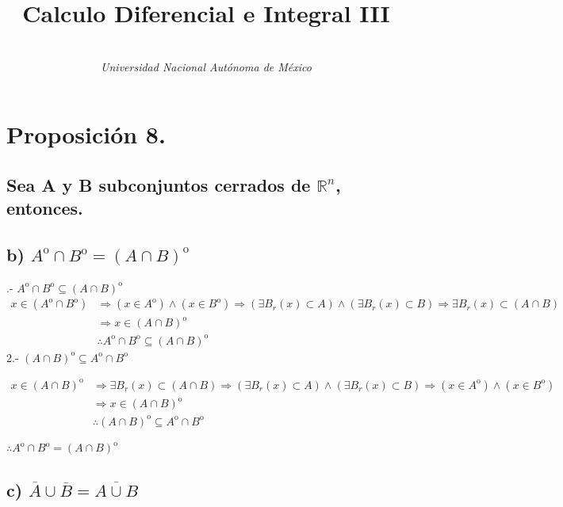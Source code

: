 \documentclass[secnumarabic,balancelastpage,amsmath,amssymb]{article}
\begin{document}
\title{\vspace{-15mm}\textbf{Calculo Diferencial e Integral III}}
\author{\\ \emph{Universidad Nacional Autónoma de México }}

\section{Proposición 8.}
\subsection*{Sea A y B subconjuntos cerrados de $\mathbb {R}^{n}$, entonces.}
\subsection*{b) $A^{\mathrm{o}} \cap B^{\mathrm{o}} =  (A \cap B)^{\mathrm{o}}$ }

.- $A^{\mathrm{o}} \cap B^{\mathrm{o}} \subseteq (A \cap B)^{\mathrm{o}} $ \begin{equation}
\begin{split}
x \in (A^{\mathrm{o}} \cap B^{\mathrm{o}}) &\Rightarrow   (x \in A^{\mathrm{o}}) \land  (x \in B^{\mathrm{o}}) \Rightarrow (\exists B_r(x) \subset A) \land (\exists B_r(x) \subset B) \Rightarrow \exists B_r(x) \subset (A\cap B) \\
& \Rightarrow x \in (A \cap B)^{\mathrm{o}} \\
& \therefore A^{\mathrm{o}} \cap B^{\mathrm{o}} \subseteq (A \cap B)^{\mathrm{o}}
\end{split}
\end{equation}
2.- $ (A \cap B)^{\mathrm{o}} \subseteq A^{\mathrm{o}} \cap B^{\mathrm{o}} $

\begin{equation}
\begin{split}
x \in (A \cap B)^{\mathrm{o}} & \Rightarrow \exists B_r(x) \subset (A \cap B) \Rightarrow (\exists B_r(x) \subset A) \land (\exists B_r(x) \subset B) \Rightarrow (x \in A^{\mathrm{o}})\land(x \in B^{\mathrm{o}}) \\
& \Rightarrow x\in (A \cap B)^{\mathrm{o}} \\
& \therefore  (A \cap B)^{\mathrm{o}} \subseteq A^{\mathrm{o}} \cap B^{\mathrm{o}}
\end{split}
\end{equation}

$\therefore  A^{\mathrm{o}} \cap B^{\mathrm{o}} =  (A \cap B)^{\mathrm{o}}$
\subsection*{c) $\overline{A} \cup \overline{B} = \overline{A \cup B}$ }
\end{document}
